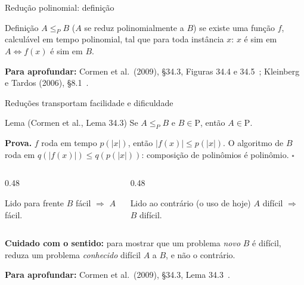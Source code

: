 \documentclass[aspectratio=169,xcolor=table]{beamer}
\newcommand{\fonte}[1]{%
  \vfill
  {\tiny\color{gray!55!black}\textbf{Para aprofundar:} #1\par}%
}
\begin{document}
\begin{frame}{Redução polinomial: definição}
  \begin{block}{Definição}
    \small
    $A \le_P B$ ($A$ se reduz polinomialmente a $B$) se existe uma função $f$, calculável em
    tempo polinomial, tal que para toda instância $x$:
    \quad $x$ é sim em $A \iff f(x)$ é sim em $B$.
  \end{block}
  \begin{center}
  \end{center}
  \fonte{Cormen et al.\ (2009), \S 34.3, Figuras 34.4 e 34.5~\cite{cormen2009introduction};
    Kleinberg e Tardos (2006), \S 8.1~\cite{kleinberg2006algorithm}.}
\end{frame}

\begin{frame}{Reduções transportam facilidade e dificuldade}
  \begin{block}{Lema (Cormen et al., Lema 34.3)}
    \small
    Se $A \le_P B$ e $B \in \mathrm{P}$, então $A \in \mathrm{P}$.
  \end{block}
  \scriptsize
  \textbf{Prova.} $f$ roda em tempo $p(|x|)$, então $|f(x)| \le p(|x|)$. O algoritmo de $B$
  roda em $q(|f(x)|) \le q(p(|x|))$: composição de polinômios é polinômio. \hfill$\square$
  \medskip

  \begin{columns}[T]
    \begin{column}{0.48\textwidth}
      \begin{exampleblock}{Lido para frente}
        $B$ fácil $\Rightarrow$ $A$ fácil.
      \end{exampleblock}
    \end{column}
    \begin{column}{0.48\textwidth}
      \begin{alertblock}{Lido ao contrário (o uso de hoje)}
        $A$ difícil $\Rightarrow$ $B$ difícil.
      \end{alertblock}
    \end{column}
  \end{columns}
  \medskip
  \textbf{Cuidado com o sentido:} para mostrar que um problema \emph{novo} $B$ é difícil,
  reduza um problema \emph{conhecido} difícil $A$ a $B$, e não o contrário.
  \fonte{Cormen et al.\ (2009), \S 34.3, Lema 34.3~\cite{cormen2009introduction}.}
\end{frame}
\end{document}
